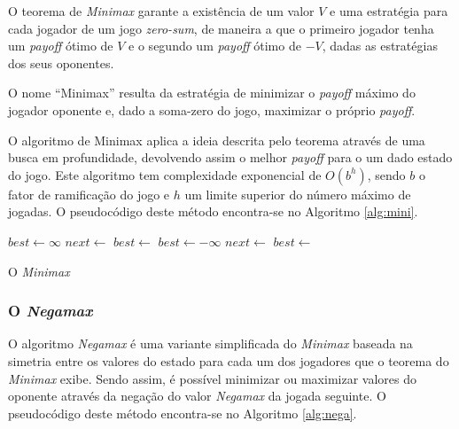 \documentclass[12pt,a4paper,oneside]{article}
\begin{document}
O teorema de \textit{Minimax} garante a existência de um valor $V$ e
uma estratégia para cada jogador de um jogo \emph{zero-sum}, de
maneira a que o primeiro jogador tenha um \emph{payoff} ótimo de $V$ e
o segundo um \emph{payoff} ótimo de $-V$, dadas as estratégias dos
seus oponentes.

O nome ``Minimax'' resulta da estratégia de minimizar o \emph{payoff}
máximo do jogador oponente e, dado a soma-zero do jogo, maximizar o
próprio \emph{payoff}.

O algoritmo de Minimax aplica a ideia descrita pelo teorema através de
uma busca em profundidade, devolvendo assim o melhor \emph{payoff}
para o um dado estado do jogo. Este algoritmo tem complexidade
exponencial de $O(b^{h})$, sendo $b$ o fator de ramificação do jogo e
$h$ um limite superior do número máximo de jogadas. O pseudocódigo
deste método encontra-se no Algoritmo \ref{alg:mini}.

\begin{algorithm}
\begin{algorithmic}
 
   
  \EndIf
      \State $best \gets \infty$
          \State $next \gets$ 
          \State $best \gets$ 
      \EndFor
      \State $best \gets -\infty$
          \State $next \gets$ 
          \State $best \gets$ 
      \EndFor
  \EndIf
  \State{} 
\EndFunction
\end{algorithmic}
\caption{O \textit{Minimax}}
\label{alg:mini}
\end{algorithm}

\subsubsection{O \textit{Negamax}}

O algoritmo \textit{Negamax} é uma variante simplificada do
\textit{Minimax} baseada na simetria entre os valores do estado para
cada um dos jogadores que o teorema do \textit{Minimax} exibe. Sendo
assim, é possível minimizar ou maximizar valores do oponente através
da negação do valor \textit{Negamax} da jogada seguinte. O
pseudocódigo deste método encontra-se no Algoritmo \ref{alg:nega}.
\end{document}

